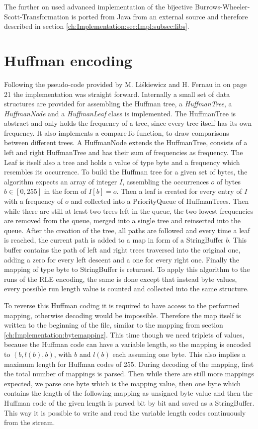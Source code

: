 \par{
	The further on used advanced implementation of the bijective Burrows-Wheeler-Scott-Transformation is ported from Java from an external source and therefore described in section \ref{ch:Implementation:sec:Impl:subsec:libs}.
}
\section{Huffman encoding}
\label{ch:Implementation:Huffman}
\par{
Following the pseudo-code provided by M. Liśkiewicz and H. Fernau in \cite{entropy-fernau} on page 21 the implementation was straight forward. Internally a small set of data structures are provided for assembling the Huffman tree, a \emph{HuffmanTree}, a \emph{HuffmanNode} and a \emph{HuffmanLeaf} class is implemented. The HuffmanTree is abstract and only holds the frequency of a tree, since every tree itself has its own frequency. It also implements a compareTo function, to draw comparisons between different trees. A HuffmanNode extends the HuffmanTree, consists of a left and right HuffmanTree and has their sum of frequencies as frequency. The Leaf is itself also a tree and holds a value of type byte and a frequency which resembles its occurrence. To build the Huffman tree for a given set of bytes, the algorithm expects an array of integer $I$, assembling the occurrences $o$ of bytes $b \in [ 0,255 ]$ in the form of $I [ b ] = o$. Then a leaf is created for every entry of $I$ with a frequency of $o$ and collected into a PriorityQueue of HuffmanTrees. Then while there are still at least two trees left in the queue, the two lowest frequencies are removed from the queue, merged into a single tree and reinserted into the queue. After the creation of the tree, all paths are followed and every time a leaf is reached, the current path is added to a map in form of a StringBuffer $b$. This buffer contains the path of left and right trees traversed into the original one, adding a zero for every left descent and a one for every right one. Finally the mapping of type byte to StringBuffer is returned. To apply this algorithm to the runs of the RLE encoding, the same is done except that instead byte values, every possible run length value is counted and collected into the same structure.
}
\par{
To reverse this Huffman coding it is required to have access to the performed mapping, otherwise decoding would be impossible. Therefore the map itself is written to the beginning of the file, similar to the mapping from section \ref{ch:Implementation:bytemapping}. This time though we need triplets of values, because the Huffman code can have a variable length, so the mapping is encoded to $(b,l(b),b)$, with $b$ and $l(b)$ each assuming one byte. This also implies a maximum length for Huffman codes of 255. During decoding of the mapping, first the total number of mappings is parsed. Then while there are still more mappings expected, we parse one byte which is the mapping value, then one byte which contains the length of the following mapping as unsigned byte value and then the Huffman code of the given length is parsed bit by bit and saved as a StringBuffer. This way it is possible to write and read the variable length codes continuously from the stream. 
}
